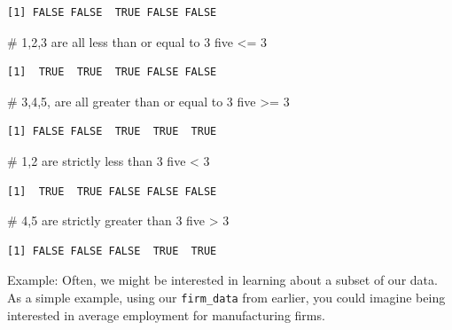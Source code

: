 \documentclass[
  letterpaper,
  DIV=11,
  numbers=noendperiod]{scrreprt}
\newenvironment{Shaded}{\begin{snugshade}}{\end{snugshade}}
\newcommand{\CommentTok}[1]{\textcolor[rgb]{0.37,0.37,0.37}{#1}}
\newcommand{\DecValTok}[1]{\textcolor[rgb]{0.68,0.00,0.00}{#1}}
\newcommand{\NormalTok}[1]{\textcolor[rgb]{0.00,0.23,0.31}{#1}}
\newcommand{\SpecialCharTok}[1]{\textcolor[rgb]{0.37,0.37,0.37}{#1}}
\begin{document}
\begin{verbatim}
[1] FALSE FALSE  TRUE FALSE FALSE
\end{verbatim}

\begin{Shaded}
\begin{Highlighting}[]
\CommentTok{\# 1,2,3 are all less than or equal to 3}
\NormalTok{five }\SpecialCharTok{\textless{}=} \DecValTok{3}
\end{Highlighting}
\end{Shaded}

\begin{verbatim}
[1]  TRUE  TRUE  TRUE FALSE FALSE
\end{verbatim}

\begin{Shaded}
\begin{Highlighting}[]
\CommentTok{\# 3,4,5, are all greater than or equal to 3}
\NormalTok{five }\SpecialCharTok{\textgreater{}=} \DecValTok{3}
\end{Highlighting}
\end{Shaded}

\begin{verbatim}
[1] FALSE FALSE  TRUE  TRUE  TRUE
\end{verbatim}

\begin{Shaded}
\begin{Highlighting}[]
\CommentTok{\# 1,2 are strictly less than 3}
\NormalTok{five }\SpecialCharTok{\textless{}} \DecValTok{3}
\end{Highlighting}
\end{Shaded}

\begin{verbatim}
[1]  TRUE  TRUE FALSE FALSE FALSE
\end{verbatim}

\begin{Shaded}
\begin{Highlighting}[]
\CommentTok{\# 4,5 are strictly greater than 3}
\NormalTok{five }\SpecialCharTok{\textgreater{}} \DecValTok{3}
\end{Highlighting}
\end{Shaded}

\begin{verbatim}
[1] FALSE FALSE FALSE  TRUE  TRUE
\end{verbatim}

{Example: }Often, we might be interested in learning about a subset of
our data. As a simple example, using our \texttt{firm\_data} from
earlier, you could imagine being interested in average employment for
manufacturing firms.
\end{document}
